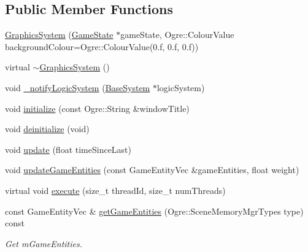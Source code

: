 \subsection*{Public Member Functions}
\begin{DoxyCompactItemize}
\item 
\hyperlink{class_common_1_1_graphics_system_a640e8520e276805c15f12d340a7b6090}{Graphics\+System} (\hyperlink{class_common_1_1_game_state}{Game\+State} $\ast$game\+State, Ogre\+::\+Colour\+Value background\+Colour=Ogre\+::\+Colour\+Value(0.f, 0.f, 0.f))
\item 
virtual \hyperlink{class_common_1_1_graphics_system_ad866bbb65f4043da5e6cab82d3eeb551}{$\sim$\+Graphics\+System} ()
\item 
void \hyperlink{class_common_1_1_graphics_system_a1bbb04c3ab640d4753f852d17a419df0}{\+\_\+notify\+Logic\+System} (\hyperlink{class_common_1_1_base_system}{Base\+System} $\ast$logic\+System)
\item 
void \hyperlink{class_common_1_1_graphics_system_ad6aec10b001fbfc10cd86cd009615745}{initialize} (const Ogre\+::\+String \&window\+Title)
\item 
void \hyperlink{class_common_1_1_graphics_system_ade2d4efd6e535d312818a92230eb7dcf}{deinitialize} (void)
\item 
void \hyperlink{class_common_1_1_graphics_system_ab2c01af1a20132c37964f34f7dfb645c}{update} (float time\+Since\+Last)
\item 
void \hyperlink{class_common_1_1_graphics_system_a9cabbf2ae25610cfa006d45a95f77d6a}{update\+Game\+Entities} (const Game\+Entity\+Vec \&game\+Entities, float weight)
\item 
virtual void \hyperlink{class_common_1_1_graphics_system_af262817d8290de7fe06e88e424bd5588}{execute} (size\+\_\+t thread\+Id, size\+\_\+t num\+Threads)
\item 
\mbox{\label{class_common_1_1_graphics_system_af658d1a3d1037affc4bce8a63ea33514}} 
const Game\+Entity\+Vec \& \hyperlink{class_common_1_1_graphics_system_af658d1a3d1037affc4bce8a63ea33514}{get\+Game\+Entities} (Ogre\+::\+Scene\+Memory\+Mgr\+Types type) const
\begin{DoxyCompactList}\small\item\em Get m\+Game\+Entities. \end{DoxyCompactList}\item 
\mbox{\label{class_common_1_1_graphics_system_a3996ebbb7e250c04cbf107efafd34984}} 

\end{DoxyCompactItemize}
